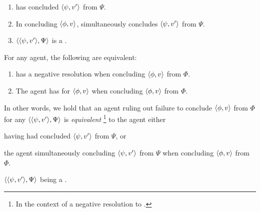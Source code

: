 \begin{note}
\begin{idea}[\iZS{-} --- \iZS{}]
\begin{itemize}
\begin{enumerate}[label=\arabic*., ref=\named{CS:\arabic*}]
\begin{enumerate}[label=\alph*., ref=\named{CS:1.\alph*}]
      \item
        \label{idea:Zs:overview:requ-sat:Past}
        \vAgent{} has concluded \(\langle \psi, v' \rangle\) from \(\Psi\).
      \item
        \label{idea:Zs:overview:requ-sat:Pres}
        In concluding \(\langle \phi, v \rangle\), \vAgent{} simultaneously concludes \(\langle \psi, v' \rangle\) from \(\Psi\).
      \item
        \label{idea:Zs:overview:requ-sat:Forgone}
        \(\langle \langle \psi, v' \rangle, \Psi \rangle\) is a .
      \end{enumerate}
    \end{enumerate}
  \end{itemize}
  \vspace{-\baselineskip}
  \end{idea}
\end{note}

\begin{note}
    \begin{proposition}
    \label{prop:qzs-tick-equals-iCS}
    For any agent, the following are equivalent:
    \begin{enumerate}[label=\arabic*., ref=(\arabic*)]
    \item
      \label{prop:qzs-tick-equals-iCS:qzS}
      \qzS{} has a negative resolution when concluding \(\langle \phi, v \rangle\) from \(\Phi\).
    \item
      \label{prop:qzs-tick-equals-iCS:ZS}
      The agent has \ZS{} for \(\langle \phi, v \rangle\) when concluding \(\langle \phi, v \rangle\) from \(\Phi\).
    \end{enumerate}
    \vspace{-\baselineskip}
  \end{proposition}
  In other words, we hold that an agent ruling out failure to conclude \(\langle \phi, v \rangle\) from \(\Phi\) for any \requ{} \(\langle \langle \psi, v' \rangle, \Psi \rangle\) is \emph{equivalent}%
  \footnote{
    In the context of a negative resolution to \qzS{}.
  }
  to the agent either
  \begin{enumerate*}[label=(\alph*)]
  \item
    having had concluded \(\langle \psi, v' \rangle\) from \(\Psi\), or
  \item
    the agent simultaneously concluding \(\langle \psi, v' \rangle\) from \(\Psi\) when concluding \(\langle \phi, v \rangle\) from \(\Phi\).
  \item
    \(\langle \langle \psi, v' \rangle, \Psi \rangle\) being a .
  \end{enumerate*}
\end{note}


